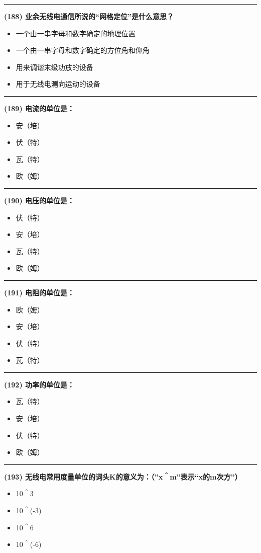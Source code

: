 \documentclass[twocolumn]{ctexart}  %
\begin{document}
\noindent\rule{0.5\textwidth}{1pt}
\heiti \textbf{(188) 业余无线电通信所说的“网格定位”是什么意思？} \songti {\color{gray} [LK1208] }
\begin{itemize}
	\item  一个由一串字母和数字确定的地理位置
	\item  一个由一串字母和数字确定的方位角和仰角
	\item  用来调谐末级功放的设备
	\item  用于无线电测向运动的设备
\end{itemize}


\noindent\rule{0.5\textwidth}{1pt}
\heiti \textbf{(189) 电流的单位是：} \songti {\color{gray} [LK0431] }
\begin{itemize}
	\item  安（培）
	\item  伏（特）
	\item  瓦（特）
	\item  欧（姆）
\end{itemize}


\noindent\rule{0.5\textwidth}{1pt}
\heiti \textbf{(190) 电压的单位是：} \songti {\color{gray} [LK0432] }
\begin{itemize}
	\item  伏（特）
	\item  安（培）
	\item  瓦（特）
	\item  欧（姆）
\end{itemize}


\noindent\rule{0.5\textwidth}{1pt}
\heiti \textbf{(191) 电阻的单位是：} \songti {\color{gray} [LK0433] }
\begin{itemize}
	\item  欧（姆）
	\item  安（培）
	\item  伏（特）
	\item  瓦（特）
\end{itemize}


\noindent\rule{0.5\textwidth}{1pt}
\heiti \textbf{(192) 功率的单位是：} \songti {\color{gray} [LK0434] }
\begin{itemize}
	\item  瓦（特）
	\item  安（培）
	\item  伏（特）
	\item  欧（姆）
\end{itemize}


\noindent\rule{0.5\textwidth}{1pt}
\heiti \textbf{(193) 无线电常用度量单位的词头K的意义为：（”x＾m”表示“x的m次方”）} \songti {\color{gray} [LK0466] }
\begin{itemize}
	\item  10＾3
	\item  10＾(-3)
	\item  10＾6
	\item  10＾(-6)
\end{itemize}
\end{document}
